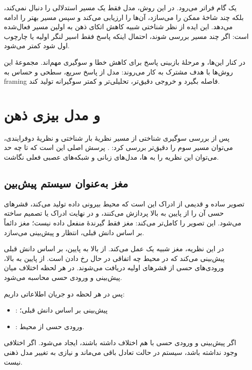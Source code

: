  یک گام فراتر می‌رود. در این روش، مدل فقط یک مسیر استدلالی را دنبال نمی‌کند، بلکه چند شاخهٔ ممکن را می‌سازد، آن‌ها را ارزیابی می‌کند و سپس مسیر بهتر را ادامه می‌دهد. این ایده از نظر شناختی شبیه کاهش اتکای ذهن به اولین مسیر فعال‌شده است: اگر چند مسیر بررسی شوند، احتمال اینکه پاسخ فقط اسیر لنگر اولیه یا چارچوب اول شود کمتر می‌شود.

در کنار این‌ها،  و مرحلهٔ بازبینی پاسخ برای کاهش خطا و سوگیری مهم‌اند. مجموعهٔ این روش‌ها با هدف مشترک به کار می‌روند: مدل از پاسخ سریع، سطحی و حساس به framing فاصله بگیرد و خروجی دقیق‌تر، تحلیلی‌تر و کمتر سوگیرانه تولید کند.

\section{ و مدل بیزی ذهن}

پس از بررسی سوگیری شناختی از مسیر نظریهٔ بار شناختی و نظریهٔ دوفرایندی، می‌توان مسیر سوم را دقیق‌تر بررسی کرد: . پرسش اصلی این است که تا چه حد می‌توان این نظریه را به ها، مدل‌های زبانی و شبکه‌های عصبی فعلی نگاشت.

\subsection{مغز به‌عنوان سیستم پیش‌بین}
تصویر ساده و قدیمی از ادراک این است که محیط بیرونی داده تولید می‌کند، قشرهای حسی آن را از پایین به بالا پردازش می‌کنند، و در نهایت ادراک یا تصمیم ساخته می‌شود.  این تصویر را کامل‌تر می‌کند: مغز فقط گیرندهٔ منفعل داده نیست؛ مغز دائماً بر اساس دانش قبلی، انتظار و پیش‌بینی می‌سازد.

در این نظریه، مغز شبیه یک  عمل می‌کند. از بالا به پایین، بر اساس دانش قبلی پیش‌بینی می‌کند که در محیط چه اتفاقی در حال رخ دادن است. از پایین به بالا، ورودی‌های حسی از قشرهای اولیه دریافت می‌شوند. در هر لحظه اختلاف میان پیش‌بینی و ورودی حسی محاسبه می‌شود.

پس در هر لحظه دو جریان اطلاعاتی داریم:
\begin{itemize}
  \item {}: پیش‌بینی بر اساس دانش قبلی؛
  \item {}: ورودی حسی از محیط.
\end{itemize}

اگر پیش‌بینی و ورودی حسی با هم اختلاف داشته باشند،  ایجاد می‌شود. اگر اختلافی وجود نداشته باشد، سیستم در حالت تعادل باقی می‌ماند و نیازی به تغییر مدل ذهنی نیست.

